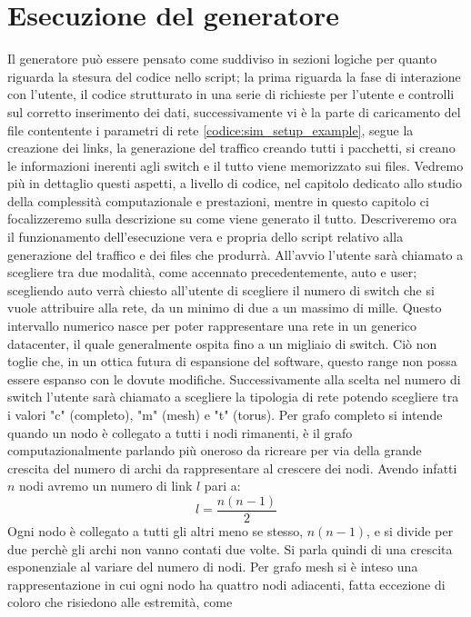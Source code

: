 \documentclass[binding=0.6cm]{sapthesis}
\begin{document}
\section{Esecuzione del generatore}
Il generatore può essere pensato come suddiviso in sezioni logiche per quanto riguarda la stesura del codice nello script; la prima riguarda la fase
di interazione con l'utente, il codice  strutturato in una serie di richieste per l'utente e controlli sul corretto inserimento dei dati, successivamente
vi è la parte di caricamento del file contentente i parametri di rete \ref{codice:sim_setup_example}, segue la creazione dei links, la generazione del traffico
creando tutti i pacchetti, si creano le informazioni inerenti agli switch e il tutto viene memorizzato sui files. Vedremo più in dettaglio questi
aspetti, a livello di codice, nel capitolo dedicato allo studio della complessità computazionale e prestazioni, mentre in questo capitolo ci focalizzeremo
sulla descrizione su come viene generato il tutto.
Descriveremo ora il funzionamento dell'esecuzione vera e propria dello script relativo alla generazione del traffico e dei files che produrrà.
All'avvio l'utente sarà chiamato a scegliere tra due modalità, come accennato precedentemente, auto e user; scegliendo auto verrà chiesto all'utente
di scegliere il numero di switch che si vuole attribuire alla rete, da un minimo di due a un massimo di mille. Questo intervallo numerico nasce per
poter rappresentare una rete in un generico datacenter, il quale generalmente ospita fino a un migliaio di switch. Ciò non toglie che,
in un ottica futura di espansione del software, questo range non possa essere espanso con le dovute modifiche. Successivamente alla scelta nel numero
di switch l'utente sarà chiamato a scegliere la tipologia di rete potendo scegliere tra i valori "c" (completo), "m" (mesh) e "t" (torus). Per 
grafo completo
si intende quando un nodo è collegato a tutti i nodi rimanenti, è il grafo computazionalmente parlando più oneroso da ricreare per via 
della grande crescita
del numero di archi da rappresentare al crescere dei nodi. Avendo infatti \(n\) nodi avremo un numero di link \(l\) pari a:
\begin{equation}
    l = \frac{n(n-1)}{2}
    \label{eq:link_number}
\end{equation}
Ogni nodo è collegato a tutti gli altri meno se stesso, \(n(n-1)\), e si divide per due perchè gli archi non vanno contati due volte. Si parla quindi di una crescita esponenziale al variare del numero di nodi.
Per grafo mesh si è inteso una rappresentazione in cui ogni nodo ha quattro nodi adiacenti, fatta eccezione di coloro che risiedono alle estremità, come
\end{document}
